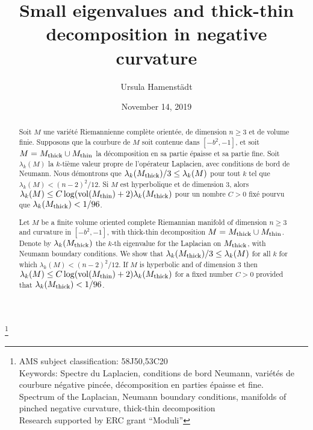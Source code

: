 \documentclass[11pt]{amsart}
\theoremstyle{plain}
\theoremstyle{plain}
\theoremstyle{definition}
\begin{document}
\title[Small eigenvalues and thick-thin decomposition]
{Small eigenvalues and thick-thin decomposition in negative curvature}
\author{Ursula Hamenst\"{a}dt}

\thanks
{AMS subject classification: 58J50,53C20\\
Keywords: Spectre du Laplacien, conditions de bord Neumann,
vari\'et\'es de courbure n\'egative pinc\'ee, d\'ecomposition
en parties \'epaisse et fine. \\
Spectrum of the Laplacian, Neumann boundary conditions, 
manifolds of pinched negative curvature, 
thick-thin decomposition\\
Research
supported by ERC grant ``Moduli''}
\date{November 14, 2019}


\begin{abstract}
Soit $M$ une vari\'et\'e Riemannienne compl\`{e}te orient\'ee,
de dimension $n\geq 3$ et de volume finie. Supposons que la
courbure de $M$ soit contenue dans $[-b^2,-1]$, et soit
$M=M_{\rm thick}\cup M_{\rm thin}$ la d\'ecomposition 
en sa partie \'epaisse et sa partie fine. Soit $\lambda_k(M)$ la 
$k$-ti\`{e}me valeur
propre de l'op\'erateur Laplacien, avec conditions de bord de Neumann. 
Nous d\'emontrons que 
$\lambda_k(M_{\rm thick})/3\leq \lambda_k(M)$ pour tout $k$ tel que
$\lambda_k(M)<(n-2)^2/12$. 
Si $M$ est hyperbolique et de dimension 3, alors $\lambda_k(M)\leq 
C\log({\rm vol}(M_{\rm thin})+2)\lambda_k(M_{\rm thick})$ pour un nombre
$C>0$ fix\'e pourvu que
$\lambda_k(M_{\rm thick})<1/96$.

\bigskip

Let $M$ be a finite volume oriented complete Riemannian
manifold of dimension $n\geq 3$ and curvature in $[-b^2,-1]$, 
with thick-thin decomposition $M=M_{\rm thick}\cup M_{\rm thin}$.
Denote by $\lambda_k(M_{\rm thick})$ 
the $k$-th eigenvalue for the Laplacian on $M_{\rm thick}$, with 
Neumann boundary conditions. We show  
that $\lambda_k(M_{\rm thick})/3\leq \lambda_k(M)$ for all $k$ for which 
$\lambda_k(M)<(n-2)^2/12$. 
If $M$ is hyperbolic and of dimension 3 then $\lambda_k(M)\leq 
C\log({\rm vol}(M_{\rm thin})+2)\lambda_k(M_{\rm thick})$ for a fixed
number $C>0$ 
provided that $\lambda_k(M_{\rm thick})<1/96$.
\end{abstract}

 

\maketitle
\end{document}
